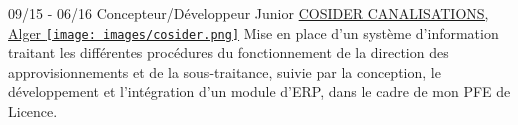 \documentclass[]{friggeri-cv}
\begin{document}
\begin{entrylist}
  \entry
    {09/15 - 06/16}
    {Concepteur/Développeur Junior}
    {\href{http://www.cosider-groupe.dz/fr/cosider-canalisations}{COSIDER CANALISATIONS, Alger \texttt{[image: images/cosider.png]}}}
    {Mise en place d'un système d'information traitant les différentes procédures du fonctionnement de la direction des approvisionnements et de la sous-traitance, suivie par la conception, le développement et l'intégration d'un module d'ERP, dans le cadre de mon PFE de Licence.\\}
  
\end{entrylist}

\newpage
\end{document}
